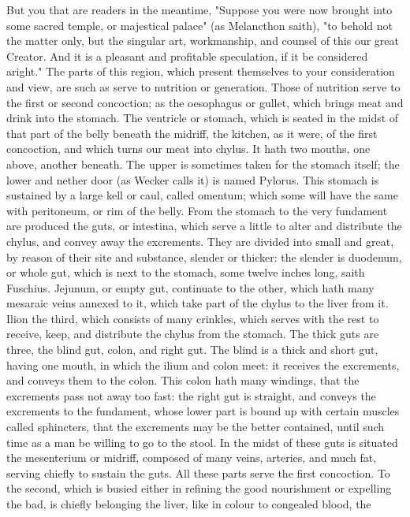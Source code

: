 But you that are readers in the meantime, "Suppose you were now brought into
some sacred temple, or majestical palace" (as Melancthon
saith), "to behold not the matter only, but the singular art, workmanship, and
counsel of this our great Creator. And it is a pleasant and profitable
speculation, if it be considered aright." The parts of this region, which
present themselves to your consideration and view, are such as serve to
nutrition or generation. Those of nutrition serve to the first or second
concoction; as the oesophagus or gullet, which brings meat and drink into the
stomach. The ventricle or stomach, which is seated in the midst of that part of
the belly beneath the midriff, the kitchen, as it were, of the first
concoction, and which turns our meat into chylus. It hath two mouths, one
above, another beneath. The upper is sometimes taken for the stomach itself;
the lower and nether door (as Wecker calls it) is named Pylorus. This stomach
is sustained by a large kell or caul, called omentum; which some will have the
same with peritoneum, or rim of the belly. From the stomach to the very
fundament are produced the guts, or intestina, which serve a little to alter
and distribute the chylus, and convey away the excrements. They are divided
into small and great, by reason of their site and substance, slender or
thicker: the slender is duodenum, or whole gut, which is next to the stomach,
some twelve inches long, saith Fuschius. Jejunum, or empty
gut, continuate to the other, which hath many mesaraic veins annexed to it,
which take part of the chylus to the liver from it. Ilion the third, which
consists of many crinkles, which serves with the rest to receive, keep, and
distribute the chylus from the stomach. The thick guts are three, the blind
gut, colon, and right gut. The blind is a thick and short gut, having one
mouth, in which the ilium and colon meet: it receives the excrements, and
conveys them to the colon. This colon hath many windings, that the excrements
pass not away too fast: the right gut is straight, and conveys the excrements
to the fundament, whose lower part is bound up with certain muscles called
sphincters, that the excrements may be the better contained, until such time as
a man be willing to go to the stool. In the midst of these guts is situated the
mesenterium or midriff, composed of many veins, arteries, and much fat, serving
chiefly to sustain the guts. All these parts serve the first concoction. To the
second, which is busied either in refining the good nourishment or expelling
the bad, is chiefly belonging the liver, like in colour to congealed blood, the
